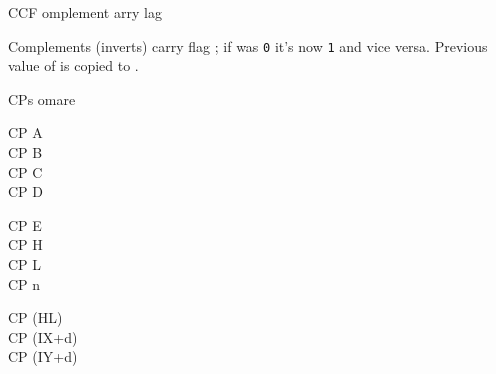 \begin{basedescript}{
	\desclabelstyle{\multilinelabel}
	\desclabelwidth{3cm}}
	\begin{DetailItem}{CCF}{}
		{omplement arry lag}
		{\SymCCF}

		Complements (inverts) carry flag \FlagCF{}; if \FlagCF{} was {\tt 0} it's now {\tt 1} and vice versa. Previous value of \FlagCF{} is copied to \FlagHF{}.

		\begin{DetailEffects}
			\FlagsCCF
		\end{DetailEffects}

		
		\begin{DetailEffectsFlags}
		\end{DetailEffectsFlags}
		
		\begin{DetailTiming}
		\end{DetailTiming}

	\end{DetailItem}

	\pagebreak


	\begin{DetailItem}{CP}{s}
		{omare}
		{}

		\begin{DetailVariants}[4]
			CP A\\
			CP B\\
			CP C\\
			CP D

			\columnbreak
			CP E\\
			CP H\\
			CP L\\
			CP n

			\columnbreak
			CP (HL)\\
			CP (IX+d)\\
			CP (IY+d)


\end{DetailVariants}
\end{DetailItem}
\end{basedescript}
